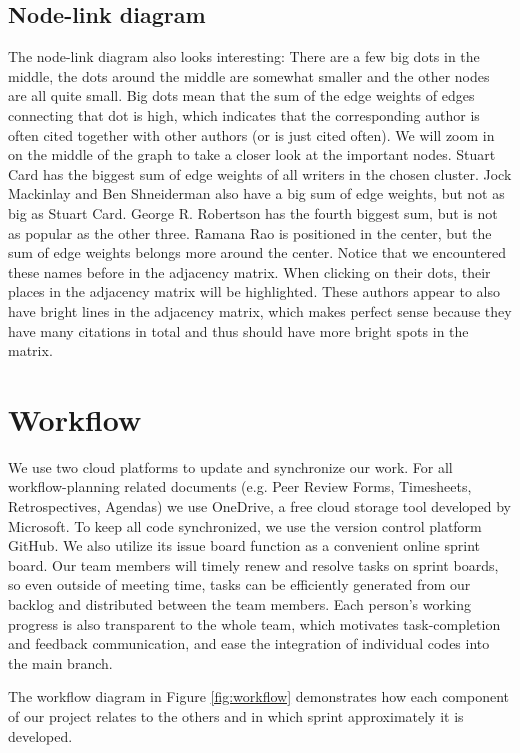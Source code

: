 \documentclass[journal]{vgtc}                %
\begin{document}
\subsection{Node-link diagram}
The node-link diagram also looks interesting: There are a few big dots in the middle, the dots around the middle are somewhat smaller and the other nodes are all quite small. Big dots mean that the sum of the edge weights of edges connecting that dot is high, which indicates that the corresponding author is often cited together with other authors (or is just cited often). We will zoom in on the middle of the graph to take a closer look at the important nodes. Stuart Card has the biggest sum of edge weights of all writers in the chosen cluster. Jock Mackinlay and Ben Shneiderman also have a big sum of edge weights, but not as big as Stuart Card. George R. Robertson has the fourth biggest sum, but is not as popular as the other three. Ramana Rao is positioned in the center, but the sum of edge weights belongs more around the center. Notice that we encountered these names before in the adjacency matrix. When clicking on their dots, their places in the adjacency matrix will be highlighted. These authors appear to also have bright lines in the adjacency matrix, which makes perfect sense because they have many citations in total and thus should have more bright spots in the matrix.

\section{Workflow} %
We use two cloud platforms to update and synchronize our work. For all workflow-planning related documents (e.g. Peer Review Forms, Timesheets, Retrospectives, Agendas) we use  OneDrive, a free cloud storage tool developed by Microsoft. To keep all code synchronized, we use the version control platform GitHub. We also utilize its issue board function as a convenient online sprint board. Our team members will timely renew and resolve tasks on sprint boards, so even outside of meeting time, tasks can be efficiently generated from our backlog and distributed between the team members. Each person's working progress is also transparent to the whole team, which motivates task-completion and feedback communication, and ease the integration of individual codes into the main branch.

The workflow diagram in Figure \ref{fig:workflow} demonstrates how each component of our project relates to the others and in which sprint approximately it is developed.
\end{document}
